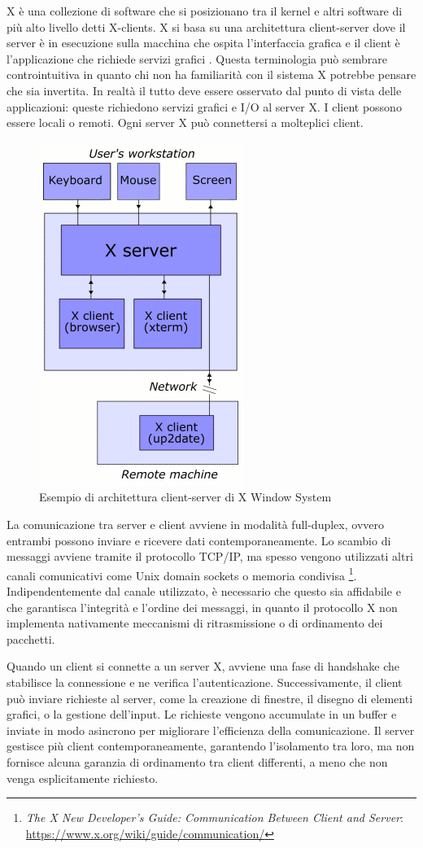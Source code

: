\documentclass[12pt,a4paper,openright,twoside]{book}
\begin{document}
X è una collezione di software che si posizionano tra il kernel e altri software di più alto livello detti X-clients.
X si basa su una architettura client-server dove il server è in esecuzione sulla macchina che ospita l'interfaccia grafica e il client è l'applicazione che richiede servizi grafici \cite{Scheifler1986}.
%
Questa terminologia può sembrare controintuitiva in quanto chi non ha familiarità con il sistema X potrebbe pensare che sia invertita.
In realtà il tutto deve essere osservato dal punto di vista delle applicazioni: queste richiedono servizi grafici e I/O al server X.
I client possono essere locali o remoti. Ogni server X può connettersi a molteplici client.
\begin{figure}
    \centering
    \includegraphics[width=.3\linewidth]{figures/X_client_server_example.png}
    \caption[xarch]{Esempio di architettura client-server di X Window System \footnotemark}
\end{figure}

La comunicazione tra server e client avviene in modalità full-duplex,
ovvero entrambi possono inviare e ricevere dati contemporaneamente.
%
Lo scambio di messaggi avviene tramite il protocollo TCP/IP,
ma spesso vengono utilizzati altri canali comunicativi come Unix domain sockets o memoria condivisa \footnote{\emph{The X New Developer’s Guide: Communication Between Client and Server}: \url{https://www.x.org/wiki/guide/communication/}}.
%
Indipendentemente dal canale utilizzato, è necessario che questo sia affidabile e che garantisca l'integrità e l'ordine dei messaggi,
in quanto il protocollo X non implementa nativamente meccanismi di ritrasmissione o di ordinamento dei pacchetti.
%

Quando un client si connette a un server X, avviene una fase di handshake che stabilisce la connessione e ne verifica l'autenticazione. Successivamente, il client può inviare richieste al server, come la creazione di finestre, il disegno di elementi grafici, o la gestione dell'input. Le richieste vengono accumulate in un buffer e inviate in modo asincrono per migliorare l'efficienza della comunicazione. Il server gestisce più client contemporaneamente, garantendo l'isolamento tra loro, ma non fornisce alcuna garanzia di ordinamento tra client differenti, a meno che non venga esplicitamente richiesto.
\end{document}
